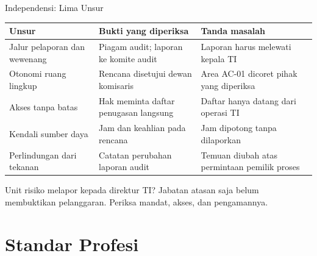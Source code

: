 \documentclass[aspectratio=169, table, 12pt]{beamer}
\begin{document}
\begin{frame}{{\Large Independensi: Lima Unsur}}
  \vspace{4pt}
  \scriptsize
  \begin{tabularx}{\textwidth}{|>{\raggedright\arraybackslash}p{}|>{\raggedright\arraybackslash}X|>{\raggedright\arraybackslash}X|}
    \hline
    \textbf{Unsur} & \textbf{Bukti yang diperiksa} & \textbf{Tanda masalah} \\ \hline
    Jalur pelaporan dan wewenang & Piagam audit; laporan ke komite audit & Laporan harus melewati
    kepala TI \\ \hline
    Otonomi ruang lingkup & Rencana disetujui dewan komisaris & Area AC-01 dicoret pihak yang
    diperiksa \\ \hline
    Akses tanpa batas & Hak meminta daftar penugasan langsung & Daftar hanya datang dari operasi TI
    \\ \hline
    Kendali sumber daya & Jam dan keahlian pada rencana & Jam dipotong tanpa dilaporkan \\ \hline
    Perlindungan dari tekanan & Catatan perubahan laporan audit & Temuan diubah atas permintaan
    pemilik proses \\ \hline
  \end{tabularx}

  \vspace{8pt}
  \small Unit risiko melapor kepada direktur TI? Jabatan atasan saja belum membuktikan pelanggaran.
  Periksa mandat, akses, dan pengamannya.
\end{frame}

\section{Standar Profesi}
\end{document}

